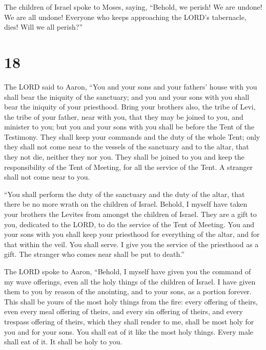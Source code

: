  The children of Israel spoke to Moses, saying, ``Behold,
we perish! We are undone! We are all undone!  Everyone
who keeps approaching the LORD's tabernacle, dies! Will we all perish?''

\hypertarget{section-17}{%
\section{18}\label{section-17}}

 The LORD said to Aaron, ``You and your sons and your
fathers' house with you shall bear the iniquity of the sanctuary; and
you and your sons with you shall bear the iniquity of your priesthood.
 Bring your brothers also, the tribe of Levi, the tribe of
your father, near with you, that they may be joined to you, and minister
to you; but you and your sons with you shall be before the Tent of the
Testimony.  They shall keep your commands and the duty of
the whole Tent; only they shall not come near to the vessels of the
sanctuary and to the altar, that they not die, neither they nor you.
 They shall be joined to you and keep the responsibility
of the Tent of Meeting, for all the service of the Tent. A stranger
shall not come near to you.

 ``You shall perform the duty of the sanctuary and the
duty of the altar, that there be no more wrath on the children of
Israel.  Behold, I myself have taken your brothers the
Levites from amongst the children of Israel. They are a gift to you,
dedicated to the LORD, to do the service of the Tent of Meeting.
 You and your sons with you shall keep your priesthood for
everything of the altar, and for that within the veil. You shall serve.
I give you the service of the priesthood as a gift. The stranger who
comes near shall be put to death.''

 The LORD spoke to Aaron, ``Behold, I myself have given
you the command of my wave offerings, even all the holy things of the
children of Israel. I have given them to you by reason of the anointing,
and to your sons, as a portion forever.  This shall be
yours of the most holy things from the fire: every offering of theirs,
even every meal offering of theirs, and every sin offering of theirs,
and every trespass offering of theirs, which they shall render to me,
shall be most holy for you and for your sons.  You shall
eat of it like the most holy things. Every male shall eat of it. It
shall be holy to you.

